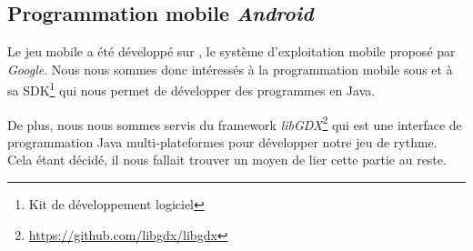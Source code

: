 \subsection{Programmation mobile \textit{Android}}

Le jeu mobile a été développé sur \android{}, le système d'exploitation mobile proposé par \textit{Google}. Nous nous sommes donc intéressés à la programmation mobile sous \android{} et à sa SDK\footnote{Kit de développement logiciel} qui nous permet de développer des programmes en Java.

De plus, nous nous sommes servis du framework \textit{libGDX}\footnote{\url{https://github.com/libgdx/libgdx}} qui est une interface de programmation Java multi-plateformes pour développer notre jeu de rythme. Cela étant décidé, il nous fallait trouver un moyen de lier cette partie au reste.